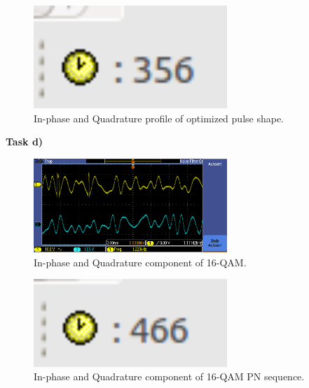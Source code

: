 \documentclass{article}
\begin{document}
\begin{figure}[h]
  \begin{center}
    \includegraphics[width=0.65\textwidth]{img/task_c_profile.png}
    \caption{In-phase and Quadrature profile of optimized pulse shape.}
  \end{center}
\end{figure}

\pagebreak
\textbf{Task d)}

\begin{figure}[h]
  \begin{center}
    \includegraphics[width=0.65\textwidth]{img/task_d_oscilloscope.png}
    \caption{In-phase and Quadrature component of 16-QAM.}
  \end{center}
\end{figure}

\begin{figure}[h]
  \begin{center}
    \includegraphics[width=0.65\textwidth]{img/task_d_profile.png}
    \caption{In-phase and Quadrature component of 16-QAM PN sequence.}
  \end{center}
\end{figure}

\pagebreak
\end{document}
